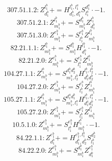 \documentclass[letterpaper,10pt,fleqn,leqno,onecolumn]{article}
\begin{document}
\begin{equation} \;\;\;\;\;\;  307.51.1.2: Z^{l_{1}^{b}}_{d_{1}^{b}}+=H^{l_{1}^{b},l_{1}^{a}}_{d_{1}^{b},d_{1}^{a}}S^{d_{1}^{a}}_{l_{1}^{a}}\cdot -1. \end{equation}
\begin{equation} \;\;\;\;\;\;  307.51.2.1: Z^{l_{1}^{b}}_{m_{1}^{b}}+=S^{d_{1}^{b}}_{m_{1}^{b}}Z^{l_{1}^{b}}_{d_{1}^{b}} \end{equation}
\begin{equation} \;\;\;\;\;\;  307.51.3.0: Z^{e_{1}^{b}}_{m_{1}^{b}}+=S^{e_{1}^{b}}_{l_{1}^{b}}Z^{l_{1}^{b}}_{m_{1}^{b}} \end{equation}
\begin{equation} \;\;\;\;\;\;  82.21.1.1: Z^{l_{1}^{b}}_{m_{1}^{b}}+=S^{d_{1}^{b}}_{m_{1}^{b}}H^{l_{1}^{b}}_{d_{1}^{b}}\cdot -1. \end{equation}
\begin{equation} \;\;\;\;\;\;  82.21.2.0: Z^{e_{1}^{b}}_{m_{1}^{b}}+=S^{e_{1}^{b}}_{l_{1}^{b}}Z^{l_{1}^{b}}_{m_{1}^{b}} \end{equation}
\begin{equation} \;\;\;\;\;\;  104.27.1.1: Z^{l_{1}^{b}}_{m_{1}^{b}}+=S^{d_{1}^{b}d_{2}^{b}}_{m_{1}^{b},l_{2}^{b}}H^{l_{1}^{b},l_{2}^{b}}_{d_{1}^{b}d_{2}^{b}}\cdot -1. \end{equation}
\begin{equation} \;\;\;\;\;\;  104.27.2.0: Z^{e_{1}^{b}}_{m_{1}^{b}}+=S^{e_{1}^{b}}_{l_{1}^{b}}Z^{l_{1}^{b}}_{m_{1}^{b}} \end{equation}
\begin{equation} \;\;\;\;\;\;  105.27.1.1: Z^{l_{1}^{b}}_{m_{1}^{b}}+=S^{d_{1}^{a}d_{1}^{b}}_{m_{1}^{b},l_{1}^{a}}H^{l_{1}^{b},l_{1}^{a}}_{d_{1}^{a}d_{1}^{b}}\cdot -1. \end{equation}
\begin{equation} \;\;\;\;\;\;  105.27.2.0: Z^{e_{1}^{b}}_{m_{1}^{b}}+=S^{e_{1}^{b}}_{l_{1}^{b}}Z^{l_{1}^{b}}_{m_{1}^{b}} \end{equation}
\begin{equation} \;\;\;\;\;\;  10.5.1.0: Z^{e_{1}^{b}}_{m_{1}^{b}}+=S^{e_{1}^{b}}_{l_{1}^{b}}H^{l_{1}^{b}}_{m_{1}^{b}}\cdot -1. \end{equation}
\begin{equation} \;\;\;\;\;\;  84.22.1.1: Z^{e_{1}^{b}}_{d_{1}^{b}}+=H^{e_{1}^{b},l_{1}^{b}}_{d_{1}^{b},d_{2}^{b}}S^{d_{2}^{b}}_{l_{1}^{b}} \end{equation}
\begin{equation} \;\;\;\;\;\;  84.22.2.0: Z^{e_{1}^{b}}_{m_{1}^{b}}+=S^{d_{1}^{b}}_{m_{1}^{b}}Z^{e_{1}^{b}}_{d_{1}^{b}} \end{equation}
\end{document}
